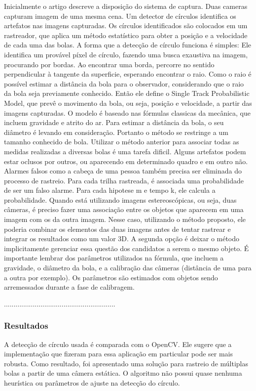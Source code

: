 	Inicialmente o artigo descreve a disposição do sistema de captura. Duas cameras capturam imagem de uma mesma cena. Um detector de círculos identifica os artefatos nas imagens capturadas. Os círculos identificados são colocados em um rastreador, que aplica um método estatístico para obter a posição e a velocidade de cada uma das bolas.
	A forma que a detecção de círculo funciona é simples: Ele identifica um provável píxel de círculo, fazendo uma busca exaustiva na imagem, procurando por bordas. Ao encontrar uma borda, percorre no sentido perpendicular à tangente da superficie, esperando encontrar o raio. Como o raio é possível estimar a distância da bola para o observador, considerando que o raio da bola seja previamente conhecido.
	Então ele define o Single Track Probabilistic Model, que prevê o movimento da bola, ou seja, posição e velocidade, a partir das imagens capturadas. O modelo é baseado nas fórmulas classicas da mecânica, que incluem gravidade e atrito do ar.  Para estimar a distância da bola, o seu diâmetro é levando em consideração. Portanto o método se restringe a um tamanho conhecido de bola.
	Utilizar o método anterior para associar todas as medidas realizadas a diversas bolas é uma tarefa dificil. Alguns artefatos podem estar oclusos por outros, ou aparecendo em determinado quadro e em outro não. Alarmes falsos como a cabeça de uma pessoa também precisa ser eliminada do processo de rastreio. Para cada trilha rastreada, é associada uma probabilidade de ser um falso alarme. Para cada hipotese m e tempo k, ele calcula a probabilidade.
	Quando está utilizando imagens estereoscópicas, ou seja, duas câmeras, é preciso fazer uma associação entre os objetos que aparecem em uma imagem com os da outra imagem. Nesse caso, utilizando o método proposto, ele poderia combinar os elementos das duas imagens antes de tentar rastrear e integrar os resultados como um valor 3D. A segunda opção é deixar o método implicitamente gerenciar essa questão dos candidatos a serem o mesmo objeto.
	É importante lembrar dos parâmetros utilizados na fórmula, que incluem a gravidade, o diâmetro da bola, e a calibração das câmeras (distância de uma para a outra por exemplo).  Os parâmetros são estimados com objetos sendo arremessados durante a fase de calibragem.

 ..........................................................
\subsubsection{Resultados}
A detecção de círculo usada é comparada com o OpenCV. Ele sugere que a implementação que fizeram para essa aplicação em particular pode ser mais robusta.
Como resultado, foi apresentado uma solução para rastreio de múltiplas bolas a partir de uma câmera estática. O algoritmo não possui quase nenhuma heurística ou parâmetros de ajuste na detecção do círculo.

